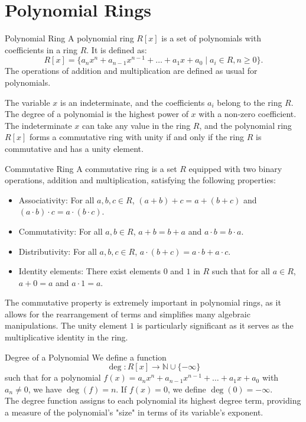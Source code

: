 \documentclass[openany]{book}
\begin{document}
\section{Polynomial Rings}
\begin{mydefinition}{Polynomial Ring}
A polynomial ring $R[x]$ is a set of polynomials with coefficients in a ring $R$. It is defined as:
\[R[x] = \{ a_n x^n + a_{n-1} x^{n-1} + \ldots + a_1 x + a_0 \mid a_i \in R, n \geq 0 \}.\]
The operations of addition and multiplication are defined as usual for polynomials.
\end{mydefinition}
The variable $x$ is an indeterminate, and the coefficients $a_i$ belong to the ring $R$. The degree of a polynomial is the highest power of $x$ with a non-zero coefficient. The indeterminate $x$ can take any value in the ring $R$, and the polynomial ring $R[x]$ forms a commutative ring with unity if and only if the ring $R$ is commutative and has a unity element.
\begin{mydefinition}{Commutative Ring}
A commutative ring is a set $R$ equipped with two binary operations, addition and multiplication, satisfying the following properties:
\begin{itemize}
    \item Associativity: For all $a, b, c \in R$, $(a + b) + c = a + (b + c)$ and $(a \cdot b) \cdot c = a \cdot (b \cdot c)$.
    \item Commutativity: For all $a, b \in R$, $a + b = b + a$ and $a \cdot b = b \cdot a$.
    \item Distributivity: For all $a, b, c \in R$, $a \cdot (b + c) = a \cdot b + a \cdot c$.
    \item Identity elements: There exist elements $0$ and $1$ in $R$ such that for all $a \in R$, $a + 0 = a$ and $a \cdot 1 = a$.
\end{itemize}
\end{mydefinition}
The commutative property is extremely important in polynomial rings, as it allows for the rearrangement of terms and simplifies many algebraic manipulations. The unity element $1$ is particularly significant as it serves as the multiplicative identity in the ring. 
\begin{mydefinition}{Degree of a Polynomial}
    We define a function $$\deg: R[x] \to \mathbb{N} \cup \{-\infty\}$$ such that for a polynomial $f(x) = a_n x^n + a_{n-1} x^{n-1} + \ldots + a_1 x + a_0$ with $a_n \neq 0$, we have $\deg(f) = n$. If $f(x) = 0$, we define $\deg(0) = -\infty$. \\
    The degree function assigns to each polynomial its highest degree term, providing a measure of the polynomial's "size" in terms of its variable's exponent.
\end{mydefinition}
\end{document}

